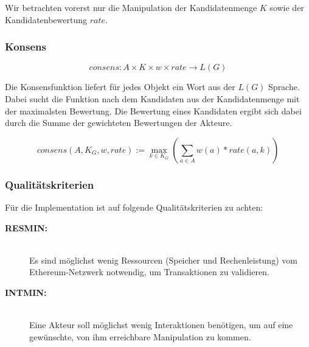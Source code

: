 \documentclass[]{article}
\begin{document}
Wir betrachten vorerst nur die Manipulation der Kandidatenmenge $K$ sowie der Kandidatenbewertung $rate$. 



\subsubsection*{Konsens}

  \[consens: A\times K\times w \times rate \rightarrow L(G)\] 


Die Konsensfunktion liefert für jedes Objekt ein Wort aus der $L(G)$ Sprache.
Dabei sucht die Funktion nach dem Kandidaten aus der Kandidatenmenge mit der maximalsten Bewertung. Die Bewertung eines Kandidaten ergibt sich dabei durch die Summe der gewichteten Bewertungen der Akteure.

\[ consens (A,K_G,w,rate) := \max_{k\in K_G} ( \sum_{a\in A} w(a) * rate(a,k) ) \] 




\subsubsection*{Qualitätskriterien}

Für die Implementation ist auf folgende Qualitätskriterien zu achten:

\begin{description} 
  \item[\textbf{RESMIN:}]\hfill \\
    Es sind möglichst wenig Ressourcen (Speicher und Rechenleistung) vom Ethereum-Netzwerk notwendig, um Transaktionen zu validieren.
  \item[\textbf{INTMIN:}]\hfill \\
    Eine Akteur soll möglichst wenig Interaktionen benötigen, um auf eine gewünschte, von ihm erreichbare Manipulation zu kommen.
\end{description}

% 
\end{document}
